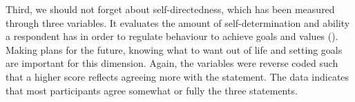 \documentclass[11pt]{article}
\begin{document}
\begin{table}[h]
\begin{minipage}[b]{0.55\linewidth}
\captionsetup{singlelinecheck=off}
\caption{Harm avoidance distribution}
\end{minipage}
\begin{minipage}[b]{0.4\linewidth}
\end{minipage}
\end{table}

Third, we should not forget about self-directedness, which has been measured
through three variables. It evaluates the amount of self-determination and
ability a respondent has in order to regulate behaviour to achieve goals and
values (\cite{tse2011}). Making plans for the future, knowing what to want out
of life and setting goals are important for this dimension. Again, the variables
were reverse coded such that a higher score reflects agreeing more with the
statement. The data indicates that most participants agree somewhat or fully the
three statements.
\end{document}
